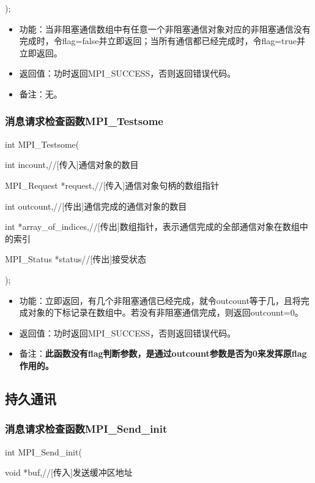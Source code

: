\documentclass[UTF8]{article}%
\begin{document}
);

\begin{itemize}
    \item 功能：当非阻塞通信数组中有任意一个非阻塞通信对象对应的非阻塞通信没有完成时，令flag=false并立即返回；当所有通信都已经完成时，令flag=true并立即返回。
    \item 返回值：功时返回MPI\_SUCCESS，否则返回错误代码。
    \item 备注：无。
\end{itemize}

\subsubsection{消息请求检查函数MPI\_Testsome}

int MPI\_Testsome(

    \qquad int           incount,//[传入]通信对象的数目

    \qquad MPI\_Request  *request,//[传入]通信对象句柄的数组指针

    \qquad int           outcount,//[传出]通信完成的通信对象的数目

    \qquad int           *array\_of\_indices,//[传出]数组指针，表示通信完成的全部通信对象在数组中的索引

    \qquad MPI\_Status   *status//[传出]接受状态
    
);

\begin{itemize}
    \item 功能：立即返回，有几个非阻塞通信已经完成，就令outcount等于几，且将完成对象的下标记录在数组中。若没有非阻塞通信完成，则返回outcount=0。
    \item 返回值：功时返回MPI\_SUCCESS，否则返回错误代码。
    \item 备注：\textbf{此函数没有flag判断参数，是通过outcount参数是否为0来发挥原flag作用的。}
\end{itemize}

\subsection{持久通讯}

\subsubsection{消息请求检查函数MPI\_Send\_init}

int MPI\_Send\_init(

    \qquad void         *buf,//[传入]发送缓冲区地址
\end{document}
